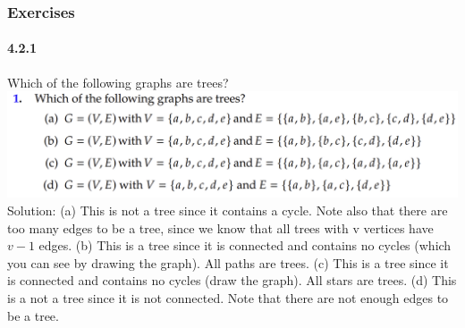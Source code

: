 \documentclass{article}
\begin{document}
\subsubsection{Exercises}
\paragraph{4.2.1}
Which of the following graphs are trees?\newline
\includegraphics{0069}\newline
Solution:\newline
(a) This is not a tree since it contains a cycle. Note also that there are too
many edges to be a tree, since we know that all trees with v vertices
have $v - 1$ edges.\newline
(b) This is a tree since it is connected and contains no cycles (which you
can see by drawing the graph). All paths are trees.\newline
(c) This is a tree since it is connected and contains no cycles (draw the
graph). All stars are trees.\newline
(d) This is a not a tree since it is not connected. Note that there are not
enough edges to be a tree.\newline
\end{document}
